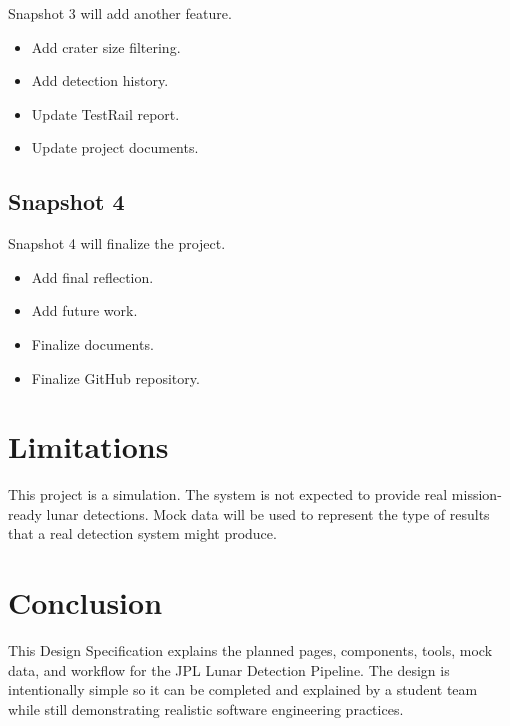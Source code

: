 \documentclass[12pt]{article}
\begin{document}
Snapshot 3 will add another feature.

\begin{itemize}
    \item Add crater size filtering.
    \item Add detection history.
    \item Update TestRail report.
    \item Update project documents.
\end{itemize}

\subsection{Snapshot 4}

Snapshot 4 will finalize the project.

\begin{itemize}
    \item Add final reflection.
    \item Add future work.
    \item Finalize documents.
    \item Finalize GitHub repository.
\end{itemize}

\section{Limitations}

This project is a simulation. The system is not expected to provide real mission-ready lunar detections. Mock data will be used to represent the type of results that a real detection system might produce.

\section{Conclusion}

This Design Specification explains the planned pages, components, tools, mock data, and workflow for the JPL Lunar Detection Pipeline. The design is intentionally simple so it can be completed and explained by a student team while still demonstrating realistic software engineering practices.
\end{document}
